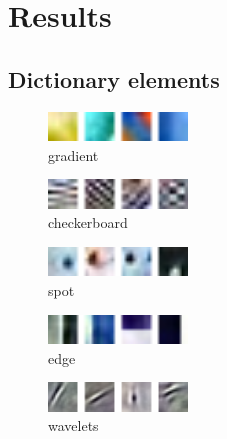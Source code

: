 \chapter{Results}


\section{Dictionary elements}

\begin{figure}[h]
\centering
\includegraphics[width = 0.33\textwidth]{images/gradient.png} 
\caption{gradient}
\label{fig:gradient}
\end{figure}

\begin{figure}[h]
\centering
\includegraphics[width = 0.33\textwidth]{images/checkerboard.png}
\caption{checkerboard}
\label{fig:checkerboard}
\end{figure}


\begin{figure}[h]
\centering
\includegraphics[width = 0.33\textwidth]{images/spot.png} 
\caption{spot}
\label{fig:spot}
\end{figure}


\begin{figure}[h]
\centering
\includegraphics[width = 0.33\textwidth]{images/edges.png}
\caption{edge}
\label{fig:edge}
\end{figure}

\begin{figure}[h]
\centering
\includegraphics[width = 0.33\textwidth]{images/wavelet.png}
\caption{wavelets}
\label{fig:wavelets}
\end{figure}

